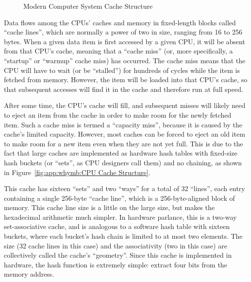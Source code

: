 \begin{figure}[htb]
\centering
{}
\caption{Modern Computer System Cache Structure}
\label{fig:app:whymb:Modern Computer System Cache Structure}
\end{figure}

Data flows among the CPUs' caches and memory in fixed-length blocks
called ``cache lines'', which are normally a power of two in size,
ranging from 16 to 256 bytes.
When a given data item is first accessed by a given CPU, it will
be absent from that CPU's cache, meaning that a ``cache miss''
(or, more specifically, a ``startup'' or ``warmup'' cache miss)
has occurred.
The cache miss means that the CPU will
have to wait (or be ``stalled'') for hundreds of cycles while the
item is fetched from memory.
However, the item will be loaded into that CPU's cache, so that
subsequent accesses will find it in the cache and therefore run
at full speed.

After some time, the CPU's cache will fill, and subsequent
misses will likely need to eject an item from the cache in order
to make room for the newly fetched item.
Such a cache miss is termed a ``capacity miss'', because it is caused
by the cache's limited capacity.
However, most caches can be forced to eject an old item to make room
for a new item even when they are not yet full.
This is due to the fact that large caches are implemented as hardware
hash tables with fixed-size hash buckets (or ``sets'', as CPU designers
call them) and no chaining, as shown in
Figure~\ref{fig:app:whymb:CPU Cache Structure}.

This cache has sixteen ``sets'' and two ``ways'' for a total of 32
``lines'', each entry containing a single 256-byte ``cache line'',
which is a 256-byte-aligned block of memory.
This cache line size is a little on the large size, but makes the hexadecimal
arithmetic much simpler.
In hardware parlance, this is a two-way set-associative cache, and
is analogous to a software hash table with
sixteen buckets, where each bucket's hash chain is limited to
at most two elements.
The size (32 cache lines in this case) and the associativity (two in
this case) are collectively called the cache's ``geometry''.
Since this cache is implemented in hardware, the hash function is
extremely simple: extract four bits from the memory address.

